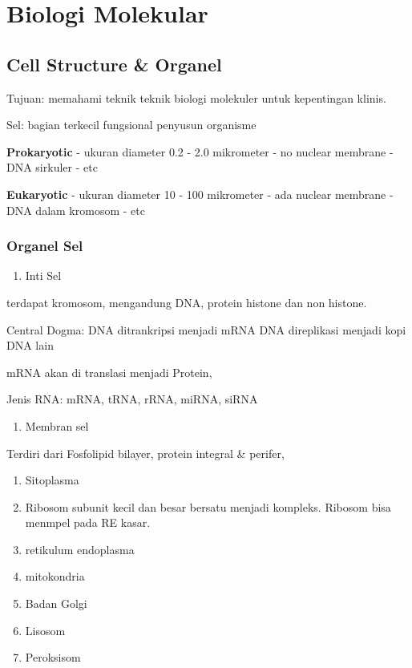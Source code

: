 \documentclass[
  letterpaper,
  DIV=11,
  numbers=noendperiod]{scrreprt}
\providecommand{\tightlist}{%
  \setlength{\itemsep}{0pt}\setlength{\parskip}{0pt}}\usepackage{longtable,booktabs,array}
\begin{document}
\chapter{Biologi Molekular}\label{biologi-molekular}

\section{Cell Structure \& Organel}\label{cell-structure-organel}

Tujuan: memahami teknik teknik biologi molekuler untuk kepentingan
klinis.

Sel: bagian terkecil fungsional penyusun organisme

\textbf{Prokaryotic} - ukuran diameter 0.2 - 2.0 mikrometer - no nuclear
membrane - DNA sirkuler - etc

\textbf{Eukaryotic} - ukuran diameter 10 - 100 mikrometer - ada nuclear
membrane - DNA dalam kromosom - etc

\subsection{Organel Sel}\label{organel-sel}

\begin{enumerate}
\def\labelenumi{\arabic{enumi}.}
\tightlist
\item
  Inti Sel
\end{enumerate}

terdapat kromosom, mengandung DNA, protein histone dan non histone.

Central Dogma: DNA ditrankripsi menjadi mRNA DNA direplikasi menjadi
kopi DNA lain

mRNA akan di translasi menjadi Protein,

Jenis RNA: mRNA, tRNA, rRNA, miRNA, siRNA

\begin{enumerate}
\def\labelenumi{\arabic{enumi}.}
\setcounter{enumi}{1}
\tightlist
\item
  Membran sel
\end{enumerate}

Terdiri dari Fosfolipid bilayer, protein integral \& perifer,

\begin{enumerate}
\def\labelenumi{\arabic{enumi}.}
\setcounter{enumi}{2}
\item
  Sitoplasma
\item
  Ribosom subunit kecil dan besar bersatu menjadi kompleks. Ribosom bisa
  menmpel pada RE kasar.
\item
  retikulum endoplasma
\item
  mitokondria
\item
  Badan Golgi
\item
  Lisosom
\item
  Peroksisom
\end{enumerate}
\end{document}
